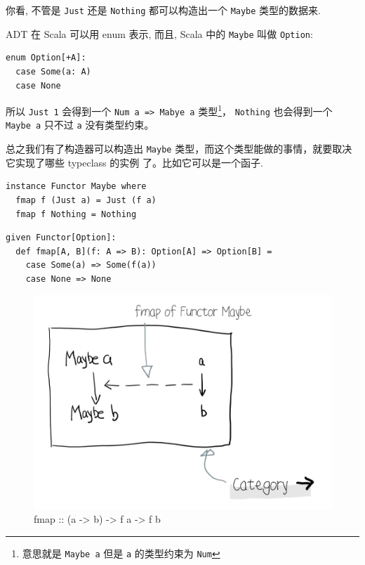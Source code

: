 \documentclass[letterspacing]{tufte-book}
\begin{document}
你看, 不管是 \texttt{Just} 还是 \texttt{Nothing} 都可以构造出一个 \texttt{Maybe} 类型的数据来.

ADT 在 Scala 可以用 enum 表示, 而且, Scala 中的 \texttt{Maybe} 叫做 \texttt{Option}:

\lstset{language=scala,label= ,caption= ,captionpos=b,numbers=none}
\begin{lstlisting}
enum Option[+A]:
  case Some(a: A)
  case None
\end{lstlisting}


所以 \texttt{Just 1} 会得到一个 \texttt{Num a => Mabye a} 类型\footnote{意思就是 \texttt{Maybe a} 但是 \texttt{a} 的类型约束为 \texttt{Num}}，
\texttt{Nothing} 也会得到一个 \texttt{Maybe a} 只不过 \texttt{a} 没有类型约束。

总之我们有了构造器可以构造出 \texttt{Maybe} 类型，而这个类型能做的事情，就要取决它实现了哪些 typeclass 的实例 了。比如它可以是一个函子.
\lstset{language=haskell,label= ,caption= ,captionpos=b,numbers=none}
\begin{lstlisting}
instance Functor Maybe where
  fmap f (Just a) = Just (f a)
  fmap f Nothing = Nothing
\end{lstlisting}

\lstset{language=scala,label= ,caption= ,captionpos=b,numbers=none}
\begin{lstlisting}
given Functor[Option]:
  def fmap[A, B](f: A => B): Option[A] => Option[B] =
    case Some(a) => Some(f(a))
    case None => None
\end{lstlisting}

\begin{figure}[htbp]
\centering
\includegraphics[width=.9\linewidth]{images/p2-maybe-functor.png}
\caption{fmap :: (a -> b) -> f a -> f b}
\end{figure}
\end{document}
